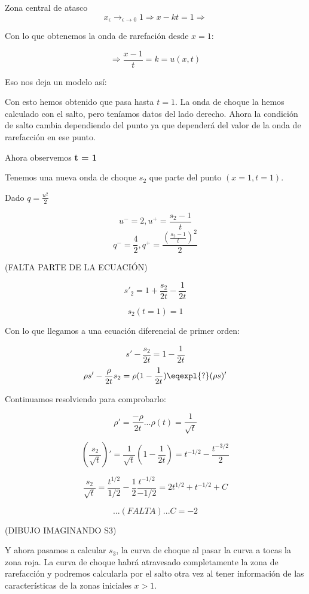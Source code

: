\begin{example}{Zona central de atasco}
			$$x_\epsilon \rightarrow_{\epsilon \rightarrow 0} 1 \Rightarrow x - kt = 1 \Rightarrow $$

			Con lo que obtenemos la onda de rarefación desde $x=1$:

			$$\Rightarrow 	\frac{x-1}{t} = k = u(x,t)$$

			Eso nos deja un modelo así:

			\begin{figure}[hbtp]
				\centering
				\caption{}
				\label{fig:ModeloTresVelocidades}
			\end{figure}

			Con esto hemos obtenido que pasa hasta $t = 1$. La onda de choque la hemos calculado con el salto, pero teníamos datos del lado derecho. Ahora la condición de salto cambia dependiendo del punto ya que dependerá del valor de la onda de rarefacción en ese punto.

			Ahora observemos \textbf{t = 1}

			Tenemos una nueva onda de choque $s_2$ que parte del punto $(x=1, t=1)$.

			Dado $q = \frac{u^2}{2}$

			$$u^{-} = 2, u^{+} = \frac{s_2-1}{t}$$
			$$q^{-} = \frac{4}{2}, q^{+} = \frac{(\frac{s_2-1}{t})^2}{2}$$

			(FALTA PARTE DE LA ECUACIÓN)

			$$s'_2 = 1 + \frac{s_2}{2t} - \frac{1}{2t}$$

			$$s_2(t = 1) = 1$$

			Con lo que llegamos a una ecuación diferencial de primer orden:

			$$s' - \frac{s_2}{2t} = 1 - \frac{1}{2t}$$
			$$\rho s' - \frac{\rho}{2t} s_2 = \rho(1 - \frac{1}{2t}) \eqexpl{?} (\rho s)'$$

			Continuamos resolviendo para comprobarlo:

			$$\rho' = \frac{-\rho}{2t} ... \rho(t) = \frac{1}{\sqrt{t}}$$

			$$(\frac{s_2}{\sqrt{t}})' = \frac{1}{\sqrt{t}} ( 1 - \frac{1}{2t}) = t^{-1/2} - \frac{t^{-3/2}}{2}$$

			$$\frac{s_2}{\sqrt{t}} = \frac{t^{1/2}}{1/2} - \frac{1}{2} \frac{t^{-1/2}}{-1/2} = 2t^{1/2} + t^{-1/2} + C$$

			$$ ... (FALTA) ... C= -2 $$

			(DIBUJO IMAGINANDO S3)

			Y ahora pasamos a calcular $s_3$, la curva de choque al pasar la curva a tocas la zona roja. La curva de choque habrá atravesado completamente la zona de rarefacción y podremos calcularla por el salto otra vez al tener información de las características de la zonas iniciales $x>1$.


\end{example}
